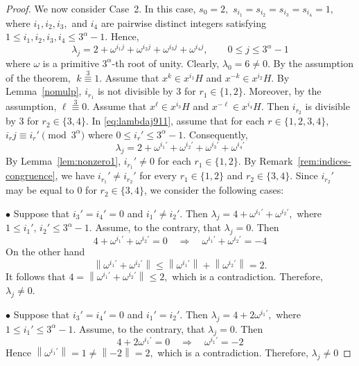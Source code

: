 \documentclass[12pt]{article}
\begin{document}
\begin{proof}
 We now consider Case~2. In this case,
 $
 s_0=2,$
 $s_{i_1}=s_{i_2}=s_{i_3}=s_{i_4}=1,$
 where \(i_1,i_2,i_3,\) and \(i_4\) are pairwise distinct integers satisfying
 $
 1\le i_1,i_2,i_3,i_4\le 3^{\alpha}-1.
 $
 Hence,
 \begin{equation}\label{eq:lambdaj911}
 \lambda_j
 =
 2+\omega^{i_1j}+\omega^{i_2j}+\omega^{i_3j}+\omega^{i_4j}, \qquad
 0\le j\le 3^{\alpha}-1
\end{equation}
 where $\omega$ is a primitive $3^{\alpha}$-th root of unity. Clearly,
 $\lambda_0=6\neq0.$ By the assumption of the theorem, $\; k\stackrel{3}{\equiv}1$. Assume that $x^k\in x^{i_1}H$ and $x^{-k}\in x^{i_2}H$. By Lemma~\ref{nomulp}, $i_{r_1}$ is not divisible by $3$ for $r_1\in\{1,2\}$. Moreover, by the assumption, $\ell\stackrel{3}{\equiv}0$. Assume that $x^\ell\in x^{i_3}H$ and $x^{-\ell}\in x^{i_4}H$. Then $i_{r_2}$ is divisible by $3$ for $r_2\in\{3,4\}$. In \eqref{eq:lambdaj911}, assume that for each $r\in\{1,2,3,4\}$,
 $	i_rj \equiv i_r' \pmod{3^\alpha}$
 where $0\le i_r'\le 3^\alpha-1$. Consequently,
\[
	\lambda_j=2+\omega^{i_1'}+\omega^{i_2'}+\omega^{i_3'}+\omega^{i_4'}
\]
 By Lemma~\ref{lem:nonzero1}, $i_{r_1}'\neq 0$ for each $r_1\in\{1,2\}$.
 By Remark~\ref{rem:indices-congruence}, we have $i_{r_1}'\neq i_{r_2}'$ for every $r_1\in\{1,2\}$ and $r_2\in\{3,4\}$. Since $i_{r_2}'$ may be equal to $0$ for $r_2\in\{3,4\}$, we consider the following cases:

 $\bullet$
 Suppose that $i_3'=i_4'=0$ and $i_1'\neq i_2'$. Then
 $
 \lambda_j=4+\omega^{i_1'}+\omega^{i_2'},
 $
 where
 $
 1\le i_1',\,i_2'\le 3^\alpha-1.
 $ Assume, to the contrary, that $\lambda_j=0$. Then
 \[
 4+\omega^{i_1'}+\omega^{i_2'}=0
 \quad\Longrightarrow\quad
 \omega^{i_1'}+\omega^{i_2'}=-4
 \]
 On the other hand
 \[
 \left\|\omega^{i_1'}+\omega^{i_2'}\right\|
 \le
 \left\|\omega^{i_1'}\right\|
 +
 \left\|\omega^{i_2'}\right\|
 =2.
 \]
 It follows that
 $
 4=\left\|\omega^{i_1'}+\omega^{i_2'}\right\|\le2,
 $
 which is a contradiction. Therefore,
 $
 \lambda_j\neq0.
 $

 \medskip

 $\bullet$
 Suppose that $i_3'=i_4'=0$ and $i_1'=i_2'$. Then
 $
 \lambda_j=4+2\omega^{i_1'},
 $
 where $1\le i_1'\le 3^\alpha-1$. Assume, to the contrary, that $\lambda_j=0$. Then
 \[
 4+2\omega^{i_1'}=0
 \quad\Longrightarrow\quad
 \omega^{i_1'}=-2
 \]
 Hence $
 \left\|\omega^{i_1'}\right\|=1\neq\left\|-2\right\|=2,
 $
 which is a contradiction. Therefore,
 $
 \lambda_j\neq0
 $

 \medskip


\end{proof}
\end{document}
